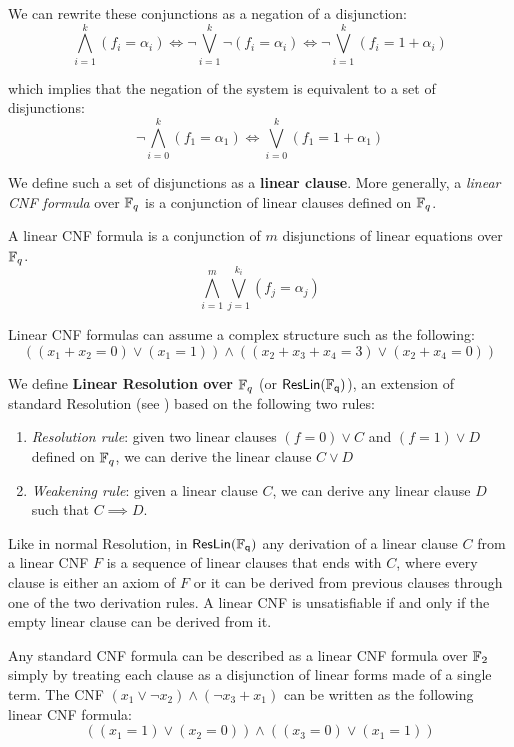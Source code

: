\noindent
We can rewrite these conjunctions as a negation of a disjunction:
\[\bigwedge_{i = 1}^k (f_i = \alpha_i) \iff \lnot \bigvee_{i = 1}^k \lnot (f_i = \alpha_i) \iff \lnot \bigvee_{i = 1}^k (f_i = 1 + \alpha_i)\]

\noindent
which implies that the negation of the system is equivalent to a set of disjunctions:
\[\lnot \bigwedge_{i = 0}^k (f_1 = \alpha_1) \iff \bigvee_{i = 0}^k (f_1 = 1 + \alpha_1)\]

\noindent
We define such a set of disjunctions as a \textbf{linear clause}. More generally, a \textit{linear CNF formula} over $\mathbb{F}_q$ is a conjunction of linear clauses defined on $\mathbb{F}_q$.

\begin{definition}
 A linear CNF formula is a conjunction of $m$ disjunctions of linear equations over $\mathbb{F}_q$.
    \[\bigwedge_{i = 1}^m \bigvee_{j = 1}^{k_i} (f_j = \alpha_j)\]
\end{definition}

Linear CNF formulas can assume a complex structure such as the following:
\[((x_1+x_2 = 0) \lor (x_1 = 1)) \land ((x_2 + x_3 + x_4 = 3) \lor (x_2 + x_4 = 0))\]

We define \textbf{Linear Resolution over $\mathbb{F}_q$} (or $\mathsf{ResLin(\mathbb{F}_q)}$), an extension of standard Resolution (see ) based on the following two rules:
\begin{enumerate}
    \item \textit{Resolution rule}: given two linear clauses $(f = 0) \lor C$ and $(f = 1) \lor D$ defined on $\mathbb{F}_q$, we can derive the linear clause $C \lor D$
    \item \textit{Weakening rule}: given a linear clause $C$, we can derive any linear clause $D$ such that $C \implies D$.
\end{enumerate}

Like in normal Resolution, in $\mathsf{ResLin(\mathbb{F}_q)}$ any derivation of a linear clause $C$ from a linear CNF $F$ is a sequence of linear clauses that ends with $C$, where every clause is either an axiom of $F$ or it can be derived from previous clauses through one of the two derivation rules. A linear CNF is unsatisfiable if and only if the empty linear clause can be derived from it. 

Any standard CNF formula can be described as a linear CNF formula over $\mathbb{F}_2$ simply by treating each clause as a disjunction of linear forms made of a single term. The CNF $(x_1 \lor \lnot{x_2}) \land (\lnot{x_3} + x_1)$ can be written as the following linear CNF formula:
\[((x_1 = 1) \lor (x_2 = 0)) \land ((x_3 = 0) \lor (x_1 = 1))\]

